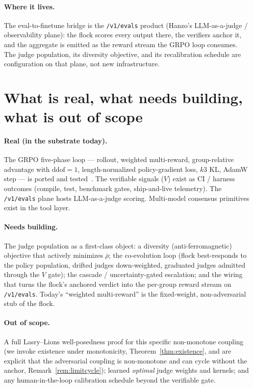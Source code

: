 \documentclass[11pt]{article}
\theoremstyle{definition}
\theoremstyle{remark}
\begin{document}
\paragraph{Where it lives.} The eval-to-finetune bridge is the \texttt{/v1/evals} product (Hanzo's
LLM-as-a-judge / observability plane): the flock scores every output there, the verifiers anchor it, and
the aggregate is emitted as the reward stream the GRPO loop consumes. The judge population, its diversity
objective, and its recalibration schedule are configuration on that plane, not new infrastructure.

\section{What is real, what needs building, what is out of scope}
\label{sec:accounting}

\paragraph{Real (in the substrate today).} The GRPO five-phase loop --- rollout, weighted multi-reward,
group-relative advantage with $\text{ddof}=1$, length-normalized policy-gradient loss, $k3$ KL, AdamW step ---
is ported and tested~\cite{hanzo-native-training}. The verifiable signals ($V$) exist as CI / harness
outcomes (compile, test, benchmark gates, ship-and-live telemetry). The \texttt{/v1/evals} plane hosts
LLM-as-a-judge scoring. Multi-model consensus primitives exist in the tool layer.

\paragraph{Needs building.} The judge population as a first-class object: a diversity (anti-ferromagnetic)
objective that actively minimizes $\bar\rho$; the co-evolution loop (flock best-responds to the policy
population, drifted judges down-weighted, graduated judges admitted through the $V$ gate); the cascade /
uncertainty-gated escalation; and the wiring that turns the flock's anchored verdict into the per-group
reward stream on \texttt{/v1/evals}. Today's ``weighted multi-reward'' is the fixed-weight, non-adversarial
stub of the flock.

\paragraph{Out of scope.} A full Lasry--Lions well-posedness proof for this specific non-monotone coupling
(we invoke existence under monotonicity, Theorem~\ref{thm:existence}, and are explicit that the adversarial
coupling is non-monotone and can cycle without the anchor, Remark~\ref{rem:limitcycle}); learned
\emph{optimal} judge weights and kernels; and any human-in-the-loop calibration schedule beyond the
verifiable gate.
\end{document}
